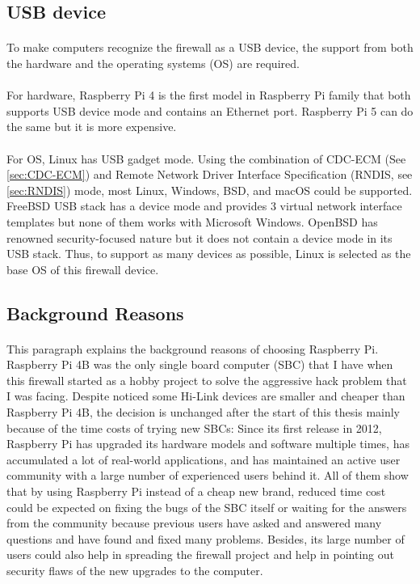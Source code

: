 \documentclass[mscthesis]{usiinfthesis}
\begin{document}
\subsection{USB device}
\paragraph{}
To make computers recognize the firewall as a USB device, the support from both the hardware and the operating systems (OS) are required.
\paragraph{}
For hardware, Raspberry Pi 4 is the first model in Raspberry Pi family that both supports USB device mode and contains an Ethernet port. Raspberry Pi 5 can do the same but it is more expensive.
\paragraph{}
For OS, Linux has USB gadget mode. Using the combination of CDC-ECM (See \cref{sec:CDC-ECM}) and Remote Network Driver Interface Specification (RNDIS, see \cref{sec:RNDIS}) mode, most Linux, Windows, BSD, and macOS could be supported. FreeBSD USB stack has a device mode and provides 3 virtual network interface templates but none of them works with Microsoft Windows\citep{freebsdhb:usb}. OpenBSD has renowned security-focused nature but it does not contain a device mode in its USB stack. Thus, to support as many devices as possible, Linux is selected as the base OS of this firewall device.

\subsection{Background Reasons}
\paragraph{}
This paragraph explains the background reasons of choosing Raspberry Pi. Raspberry Pi 4B was the only single board computer (SBC) that I have when this firewall started as a hobby project to solve the aggressive hack problem that I was facing. Despite noticed some Hi-Link devices are smaller and cheaper than Raspberry Pi 4B, the decision is unchanged after the start of this thesis mainly because of the time costs of trying new SBCs: Since its first release in 2012, Raspberry Pi has upgraded its hardware models and software multiple times, has accumulated a lot of real-world applications, and has maintained an active user community with a large number of experienced users behind it. All of them show that by using Raspberry Pi instead of a cheap new brand, reduced time cost could be expected on fixing the bugs of the SBC itself or waiting for the answers from the community because previous users have asked and answered many questions and have found and fixed many problems. Besides, its large number of users could also help in spreading the firewall project and help in pointing out security flaws of the new upgrades to the computer.
\end{document}
